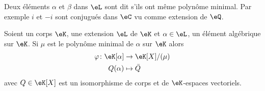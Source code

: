 Deux éléments \( \alpha\) et \( \beta\) dans \( \eL\) sont dit  s'ils ont même polynôme minimal. Par exemple \( i\) et \( -i\) sont conjugués dans \( \eC\) vu comme extension de \( \eQ\).

\begin{lemma}       \label{LEMooHKTMooKEoOuK}
    Soient un corps \( \eK\), une extension \( \eL\) de \( \eK\) et \( \alpha\in \eL\), un élément algébrique sur \( \eK\). Si \( \mu\) est le polynôme minimal de \( \alpha\) sur \( \eK\) alors
    \begin{equation}
        \begin{aligned}
            \varphi\colon \eK[\alpha]&\to \eK[X]/(\mu) \\
            Q(\alpha)&\mapsto \bar Q 
        \end{aligned}
    \end{equation}
    avec \( Q\in\eK[X]\) est un isomorphisme de corps et de \( \eK\)-espaces vectoriels.
\end{lemma}

